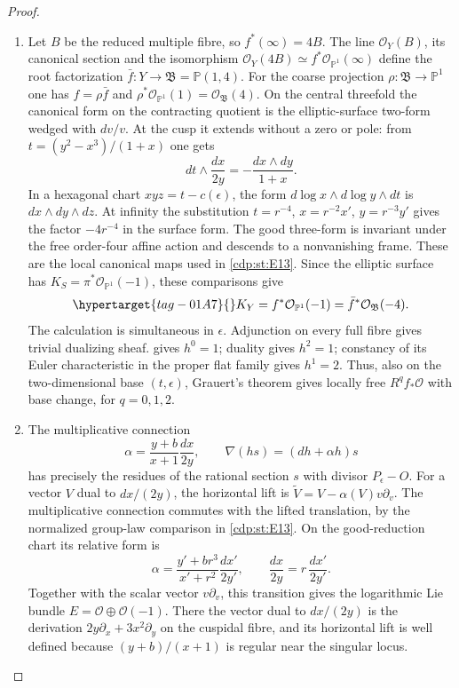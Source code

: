 \begin{proof}
\begin{enumerate}[label=\arabic*.,leftmargin=*]
\item Let $B$ be the reduced multiple fibre, so $f^*(\infty)=4B$.
The line $\mathcal O_Y(B)$, its canonical section and the isomorphism
$\mathcal O_Y(4B)\simeq f^*\mathcal O_{\mathbb P^1}(\infty)$ define
the root factorization $\bar f:Y\to\mathfrak B=\mathbb P(1,4)$.
For the coarse projection $\rho:\mathfrak B\to\mathbb P^1$ one has
$f=\rho\bar f$ and
$\rho^*\mathcal O_{\mathbb P^1}(1)=\mathcal O_{\mathfrak B}(4)$.
On the central threefold the
canonical form on the contracting quotient is the elliptic-surface
two-form wedged with $dv/v$. At the cusp it extends without a zero
or pole: from $t=(y^2-x^3)/(1+x)$ one gets
\[
 dt\wedge\frac{dx}{2y}=-\frac{dx\wedge dy}{1+x}.
\]
In a hexagonal chart $xyz=t-c(\epsilon)$, the form
$d\log x\wedge d\log y\wedge dt$ is $dx\wedge dy\wedge dz$.
At infinity the substitution
$t=r^{-4}$, $x=r^{-2}x'$, $y=r^{-3}y'$ gives the factor $-4r^{-4}$
in the surface form. The good three-form is invariant under the
free order-four affine action and descends to a nonvanishing frame.
These are the local canonical maps used in \ref{cdp:st:E13}.
Since the elliptic surface has
$K_S=\pi^*\mathcal O_{\mathbb P^1}(-1)$, these comparisons give
\begin{equation}\hypertarget{tag-01A7}{}\label{cdp:eq:E14-canonical}
 K_Y=f^*\mathcal O_{\mathbb P^1}(-1)
     =\bar f^*\mathcal O_{\mathfrak B}(-4).
\end{equation}
The calculation is simultaneous in $\epsilon$. Adjunction on every
full fibre gives trivial dualizing sheaf. \cite[Theorem~2.2, pp.~4--5]{Viaclovsky2026Combs} gives $h^0=1$;
duality gives $h^2=1$; constancy of its Euler characteristic in the
proper flat family gives $h^1=2$. Thus, also on the two-dimensional
base $(t,\epsilon)$, Grauert's theorem gives locally free $R^qf_*\mathcal O$
with base change, for $q=0,1,2$.

\item The multiplicative connection
\[
 \alpha=\frac{y+b}{x+1}\frac{dx}{2y},\qquad
 \nabla(hs)=(dh+\alpha h)s
\]
has precisely the residues of the rational section $s$ with divisor
$P_\epsilon-O$. For a vector $V$ dual to $dx/(2y)$, the horizontal lift is
$\widetilde V=V-\alpha(V)v\partial_v$. The multiplicative
connection commutes with the lifted translation, by the normalized
group-law comparison in \ref{cdp:st:E13}. On the good-reduction
chart its relative form is
\[
 \alpha=\frac{y'+br^3}{x'+r^2}\frac{dx'}{2y'},\qquad
 \frac{dx}{2y}=r\,\frac{dx'}{2y'}.
\]
Together with the scalar vector $v\partial_v$, this transition gives
the logarithmic Lie bundle $E=\mathcal O\oplus\mathcal O(-1)$. There the vector dual to $dx/(2y)$ is the derivation
$2y\partial_x+3x^2\partial_y$ on the cuspidal fibre, and its
horizontal lift is well defined because
$(y+b)/(x+1)$ is regular near the singular locus.


\end{enumerate}
\end{proof}
